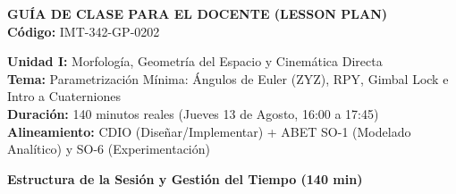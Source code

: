 \documentclass[11pt, a4paper]{article}
\begin{document}
\begin{center}
    \Large\textbf{\textcolor{ucbblue}{GUÍA DE CLASE PARA EL DOCENTE (LESSON PLAN)}}\\
    \vspace{0.2cm}
    \normalsize\textbf{Código:} IMT-342-GP-0202
\end{center}
\vspace{0.3cm}

\noindent\textbf{Unidad I:} Morfología, Geometría del Espacio y Cinemática Directa \\
\textbf{Tema:} Parametrización Mínima: Ángulos de Euler (ZYZ), RPY, Gimbal Lock e Intro a Cuaterniones \\
\textbf{Duración:} 140 minutos reales (Jueves 13 de Agosto, 16:00 a 17:45) \\
\textbf{Alineamiento:} CDIO (Diseñar/Implementar) + ABET SO-1 (Modelado Analítico) y SO-6 (Experimentación)

\vspace{0.4cm}
\noindent\textbf{\large Estructura de la Sesión y Gestión del Tiempo (140 min)}
\vspace{0.2cm}
\end{document}
